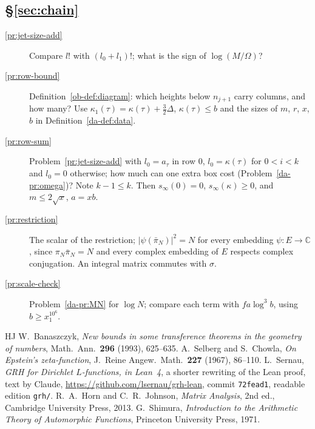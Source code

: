 \documentclass[reqno]{amsart}
\theoremstyle{definition}
\theoremstyle{plain}
\theoremstyle{remark}
\newcommand{\C}{\mathbb{C}}
\newcommand{\sinf}{s_\infty}
\begin{document}
\subsection*{\S\ref{sec:chain}}
\begin{description}
\item[\ref{pr:jet-size-add}] Compare \(l!\) with \((l_0 + l_1)!\); what is the sign of \(\log(M/\Omega)\)?
\item[\ref{pr:row-bound}] Definition~\ref{ob-def:diagram}: which heights below \(n_{j+1}\) carry columns, and how many?  Use \(\kappa_1(\tau) = \kappa(\tau) + \frac32\Delta\), \(\kappa(\tau) \le b\) and the sizes of \(m\), \(r\), \(x\), \(b\) in Definition~\ref{da-def:data}.
\item[\ref{pr:row-sum}] Problem~\ref{pr:jet-size-add} with \(l_0 = a_\tau\) in row \(0\), \(l_0 = \kappa(\tau)\) for \(0 < i < k\) and \(l_0 = 0\) otherwise; how much can one extra box cost (Problem~\ref{da-pr:omega})?  Note \(k - 1 \le k\).  Then \(\sinf(0) = 0\), \(\sinf(\kappa) \ge 0\), and \(m \le 2\sqrt x\), \(a = xb\).
\item[\ref{pr:restriction}] The scalar of the restriction; \(\lvert\psi(\bar\pi_N)\rvert^2 = N\) for every embedding \(\psi\colon E \to \C\), since \(\pi_N\bar\pi_N = N\) and every complex embedding of \(E\) respects complex conjugation.  An integral matrix commutes with \(\sigma\).
\item[\ref{pr:scale-check}] Problem~\ref{da-pr:MN} for \(\log N\); compare each term with \(fa\log^3 b\), using \(b \ge x_1^{10^6}\).
\end{description}

\begin{thebibliography}{HJ}
 W.~Banaszczyk, \emph{New bounds in some transference theorems in the geometry of numbers}, Math.\ Ann.\ \textbf{296} (1993), 625--635.
 A.~Selberg and S.~Chowla, \emph{On Epstein's zeta-function}, J.\ Reine Angew.\ Math.\ \textbf{227} (1967), 86--110.
 L.~Sernau, \emph{GRH for Dirichlet \(L\)-functions, in Lean~4}, a shorter rewriting of the Lean proof, text by Claude, \url{https://github.com/lsernau/grh-lean}, commit \texttt{72fead1}, readable edition \texttt{grh/}.
 R.~A.~Horn and C.~R.~Johnson, \emph{Matrix Analysis}, 2nd ed., Cambridge University Press, 2013.
 G.~Shimura, \emph{Introduction to the Arithmetic Theory of Automorphic Functions}, Princeton University Press, 1971.
\end{thebibliography}
\end{document}
